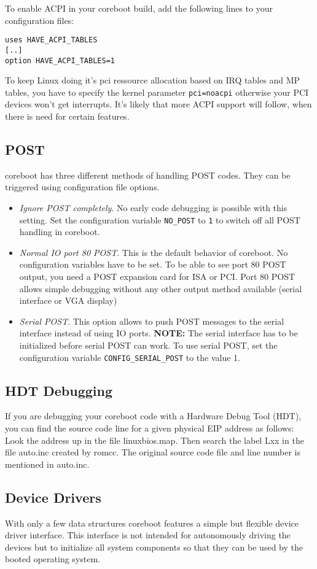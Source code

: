 \documentclass[titlepage,12pt]{article}
\begin{document}
To enable ACPI in your coreboot build, add the following lines to your
configuration files:
\begin{verbatim}
uses HAVE_ACPI_TABLES
[..]
option HAVE_ACPI_TABLES=1
\end{verbatim}

To keep Linux doing it's pci ressource allocation based on IRQ tables and MP
tables, you have to specify the kernel parameter \texttt{pci=noacpi} otherwise
your PCI devices won't get interrupts. 
It's likely that more ACPI support will follow, when there is need for certain
features.

\subsection{POST}
coreboot has three different methods of handling POST codes. They can
be triggered using configuration file options.
\begin{itemize}
\item
\emph{Ignore POST completely}. No early code debugging is possible with
this setting.  Set the configuration variable \texttt{NO\_POST} to
\texttt{1} to switch off all POST handling in coreboot.
\item
\emph{Normal IO port 80 POST}. This is the default behavior of
coreboot. No configuration variables have to be set. To be able to see
port 80 POST output, you need a POST expansion card for ISA or PCI. Port
80 POST allows simple debugging without any other output method
available (serial interface or VGA display)
\item
\emph{Serial POST}. 
This option allows to push POST messages to the serial interface instead
of using IO ports. \textbf{NOTE:} The serial interface has to be
initialized before serial POST can work. To use serial POST, set the
configuration variable \texttt{CONFIG\_SERIAL\_POST} to the value 1.
\end{itemize}


\subsection{HDT Debugging}
If you are debugging your coreboot code with a Hardware Debug Tool
(HDT), you can find the source code line for a given physical EIP
address as follows: Look the address up in the file linuxbios.map. Then
search the label Lxx in the file auto.inc created by romcc. The original
source code file and line number is mentioned in auto.inc.


\subsection{Device Drivers}
With only a few data structures coreboot features a simple but flexible
device driver interface. This interface is not intended for autonomously
driving the devices but to initialize all system components so that they
can be used by the booted operating system.
\end{document}
